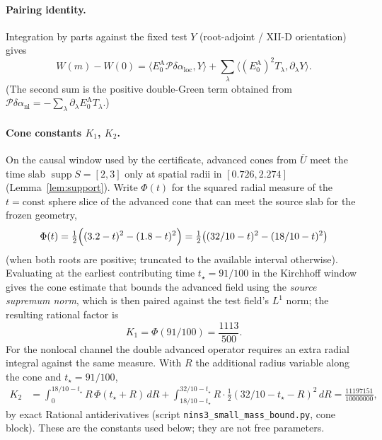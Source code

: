 \paragraph{Pairing identity.}
Integration by parts against the fixed test $Y$ (root-adjoint / XII-D orientation)
gives
\[
W(m)-W(0)
=
\langle E_0^{\mathrm A}\mathcal P\delta\alpha_{\mathrm{loc}},Y\rangle
+
\sum_{\lambda}
\langle(E_0^{\mathrm A})^2 T_\lambda,\partial_\lambda Y\rangle.
\]
(The second sum is the positive double-Green term obtained from
$\mathcal P\delta\alpha_{\mathrm{nl}}=-\sum_\lambda\partial_\lambda E_0^{\mathrm A}T_\lambda$.)

\paragraph{Cone constants $K_1$, $K_2$.}
\label{par:cone-K}
On the causal window used by the certificate, advanced cones from $\overline U$
meet the time slab $\operatorname{supp}S=[2,3]$ only at spatial radii in
$[0.726,2.274]$ (Lemma~\ref{lem:support}). Write $\Phi(t)$ for the squared radial
measure of the $t=\mathrm{const}$ sphere slice of the advanced cone that can meet
the source slab for the frozen geometry,
\[
\Phi(t)
=
\tfrac12\Bigl((3.2-t)^2-(1.8-t)^2\Bigr)
=
\tfrac12\bigl((32/10-t)^2-(18/10-t)^2\bigr)
\]
(when both roots are positive; truncated to the available interval otherwise).
Evaluating at the earliest contributing time $t_\star=91/100$ in the Kirchhoff
window gives the cone estimate that bounds the advanced field using the \emph{source supremum norm}, which is then paired against the test field's $L^1$ norm; the resulting rational factor is
\[
K_1
=
\Phi(91/100)
=
\frac{1113}{500}.
\]
For the nonlocal channel the double advanced operator requires an extra radial
integral against the same measure. With $R$ the additional radius variable along
the cone and $t_\star=91/100$,
\begin{align*}
K_2
&=
\int_{0}^{18/10-t_\star}
R\,\Phi(t_\star+R)\,dR
+
\int_{18/10-t_\star}^{32/10-t_\star}
R\cdot\tfrac12(32/10-t_\star-R)^2\,dR
=
\frac{11197151}{10000000},
\end{align*}
by exact Rational antiderivatives (script
\texttt{nins3\_small\_mass\_bound.py}, cone block). These are the constants used
below; they are not free parameters.

